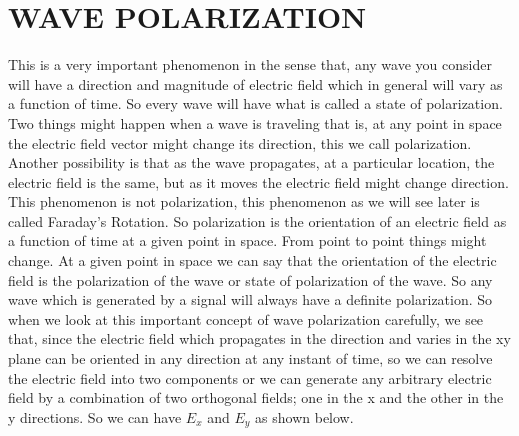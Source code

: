 \section{WAVE POLARIZATION}
This is a very important phenomenon in the sense that, any wave you consider will have a direction and magnitude of electric field which in general will vary as a function of time. So every wave will have what is called a state of polarization. Two things might happen when a wave is traveling that is, at any point in space the electric field vector might change its direction, this we call polarization. Another possibility is that as the wave propagates, at a particular location, the electric field is the same, but as it moves the electric field might change direction. This phenomenon is not polarization, this phenomenon as we will see later is called Faraday's Rotation. So polarization is the orientation of an electric field as a function of time at a given point in space. From point to point things might change.  At a given point in space we can say that the orientation of the electric field is the polarization of the wave or state of polarization of the wave. So any wave which is generated by a signal will always have a definite polarization. So when we look at this important concept of wave polarization carefully, we  see that, since the electric field which propagates in the direction and varies in the xy plane can be oriented in any direction at any instant of time, so we can resolve the electric field into two components or we can generate any arbitrary electric field by a combination of two orthogonal fields; one in the x and the other in the y directions. So we can  have $E_x$ and $E_y$ as shown below. 

